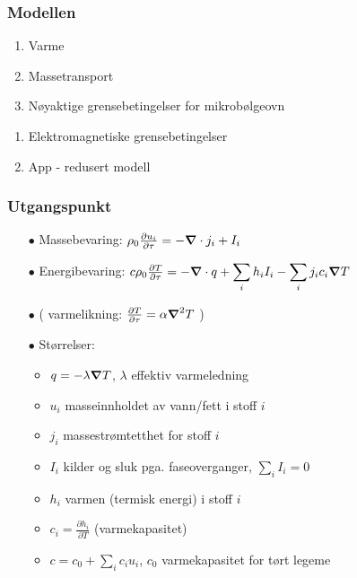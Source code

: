 \documentclass[screen]{beamer}
\newcommand{\gv}[1]{\ensuremath{\mbox{\boldmath$ #1 $}}}
\renewcommand{\div}[1]{\gv{\nabla} \cdot #1} %
\newcounter{saveenumi}
\begin{document}
\begin{frame}
  \frametitle{Modellen}
  \begin{enumerate}
  \item Varme
  \item Massetransport
  \item Nøyaktige grensebetingelser for mikrobølgeovn
    \setcounter{saveenumi}{\theenumi}
\end{enumerate}
    \hline
\begin{enumerate}
    \setcounter{enumi}{\thesaveenumi}
  \item Elektromagnetiske grensebetingelser
  \item App - redusert modell
  \end{enumerate}
\end{frame}

\begin{frame}
  \frametitle{Utgangspunkt}
  \begin{itemize}
    \item[$\bullet$] Massebevaring: $\rho_0 \frac{\partial u_i}{\partial\tau} =
      -\div{j_i} + I_i $ \vspace{10pt}
    \item[$\bullet$] Energibevaring: $c\rho_0\frac{\partial T}{\partial \tau} =
      -\div{q} + \displaystyle\sum\limits_{i} h_i I_i -
      \displaystyle\sum\limits_{i} j_i c_i {\gv\nabla} T$
    \item[$\bullet$] ( varmelikning: $\frac{\partial T}{\partial \tau} = \alpha
      {\gv\nabla}^2 T$ )
    \item[$\bullet$] \vspace{10pt} Størrelser:
      \begin{itemize}
	\item $q = -\lambda {\gv \nabla } T$, $\lambda$ effektiv varmeledning
	\item $u_i$ masseinnholdet av vann/fett i stoff $i$
	\item $j_i$ massestrømtetthet for stoff $i$
	\item $I_i$ kilder og sluk pga. faseoverganger, $\displaystyle\sum\limits_{i} I_i = 0$
	\item $h_i$ varmen (termisk energi) i stoff $i$
	\item $c_i = \frac{\partial h_i}{\partial T}$ (varmekapasitet)
	\item $c = c_0 + \displaystyle\sum\limits_{i} c_i u_i$, $c_0$ varmekapasitet for tørt legeme
      \end{itemize}
  \end{itemize}
\end{frame}
\end{document}
